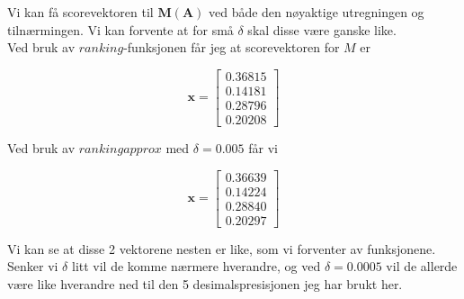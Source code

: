 \documentclass[a4paper,norsk,11pt,twoside]{article}
\begin{document}
Vi kan få scorevektoren til $\textbf{M}(\textbf{A})$ ved både den nøyaktige utregningen og tilnærmingen. Vi kan forvente at for små $\delta$ skal disse være ganske like.\\

Ved bruk av $ranking$-funksjonen får jeg at scorevektoren for $M$ er

$$
\textbf{x} = \begin{bmatrix}
0.36815 \\ 0.14181 \\ 0.28796 \\ 0.20208 
\end{bmatrix}
$$

Ved bruk av $rankingapprox$ med $\delta = 0.005$ får vi

$$
\textbf{x} = \begin{bmatrix}
0.36639 \\ 0.14224 \\ 0.28840 \\ 0.20297
\end{bmatrix}
$$

Vi kan se at disse 2 vektorene nesten er like, som vi forventer av funksjonene. Senker vi $\delta$ litt vil de komme nærmere hverandre, og ved $\delta = 0.0005$ vil de allerde være like hverandre ned til den 5 desimalspresisjonen jeg har brukt her.
\end{document}
